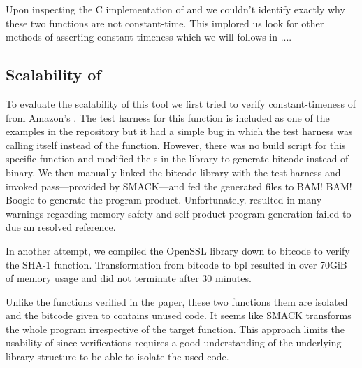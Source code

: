 Upon inspecting the C implementation of  and 
we couldn't identify exactly why these two functions are not constant-time.
This implored us look for other methods of asserting constant-timeness which
we will follows in ....



\subsection{Scalability of \ctVerif}

To evaluate the scalability of this tool we first tried to verify
constant-timeness of  from Amazon's
. The test harness for this function is included as one of the
examples in the \ctVerif repository but it had a simple bug in which the test
harness was calling itself instead of the  function.
However, there was no build script for this specific function and modified the
s in the  library to generate
 bitcode instead of binary. We then manually linked the bitcode
library with the test harness and invoked  pass---provided by
SMACK---and fed the generated  files to BAM! BAM! Boogie to
generate the program product. Unfortunately.  resulted in
many warnings regarding memory safety and self-product program generation failed
to due an resolved reference.


In another attempt, we compiled the OpenSSL library down to 
bitcode to verify the SHA-1 function. Transformation from bitcode to bpl
resulted in over 70GiB of memory usage and did not terminate after 30 minutes.


Unlike the functions verified in the paper, these two functions them are
isolated and the bitcode given to \ctVerif contains unused code. It seems like
SMACK transforms the whole program irrespective of the target function. This
approach limits the usability of \ctVerif since verifications requires a good
understanding of the underlying library structure to be able to isolate the used
code.


